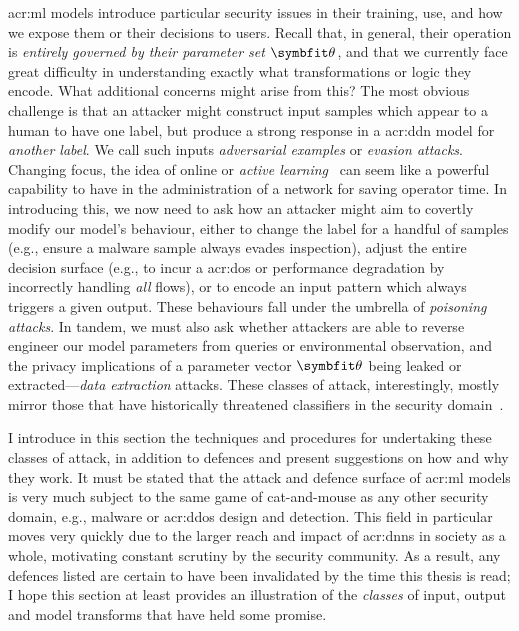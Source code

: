 \gls{acr:ml} models introduce particular security issues in their training, use, and how we expose them or their decisions to users.
Recall that, in general, their operation is \emph{entirely governed by their parameter set $\wvec{}$}, and that we currently face great difficulty in understanding exactly what transformations or logic they encode.
What additional concerns might arise from this?
The most obvious challenge is that an attacker might construct input samples which appear to a human to have one label, but produce a strong response in a \gls{acr:ddn} model for \emph{another label}.
We call such inputs \emph{adversarial examples} or \emph{evasion attacks}.
Changing focus, the idea of online or \emph{active learning}~\parencite{active-learning-report} can seem like a powerful capability to have in the administration of a network for saving operator time.
In introducing this, we now need to ask how an attacker might aim to covertly modify our model's behaviour, either to change the label for a handful of samples (e.g., ensure a malware sample always evades inspection), adjust the entire decision surface (e.g., to incur a \gls{acr:dos} or performance degradation by incorrectly handling \emph{all} flows), or to encode an input pattern which always triggers a given output.
These behaviours fall under the umbrella of \emph{poisoning attacks}.
In tandem, we must also ask whether attackers are able to reverse engineer our model parameters from queries or environmental observation, and the privacy implications of a parameter vector $\wvec{}$ being leaked or extracted---\emph{data extraction} attacks.
These classes of attack, interestingly, mostly mirror those that have historically threatened classifiers in the security domain~\parencite{DBLP:conf/ccs/BarrenoNSJT06}.


I introduce in this section the techniques and procedures for undertaking these classes of attack, in addition to defences and present suggestions on how and why they work.
It must be stated that the attack and defence surface of \gls{acr:ml} models is very much subject to the same game of cat-and-mouse as any other security domain, e.g., malware or \gls{acr:ddos} design and detection.
This field in particular moves very quickly due to the larger reach and impact of \glspl{acr:dnn} in society as a whole, motivating constant scrutiny by the security community.
As a result, any defences listed are certain to have been invalidated by the time this thesis is read; I hope this section at least provides an illustration of the \emph{classes} of input, output and model transforms that have held some promise.

